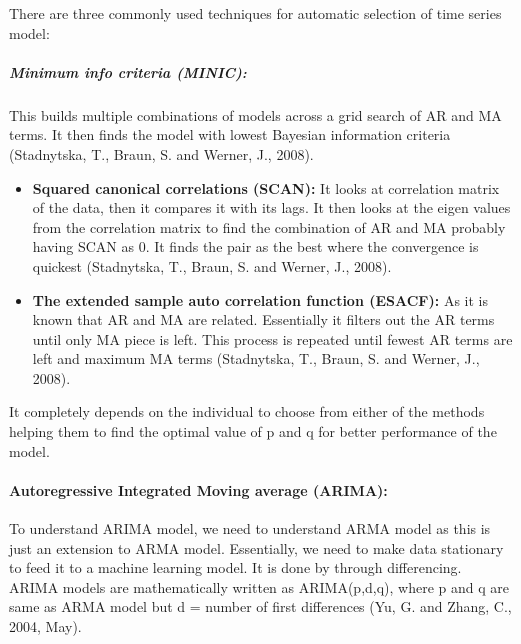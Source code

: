 \documentclass[
  letterpaper,
  DIV=11,
  numbers=noendperiod]{scrartcl}
\let\oldparagraph\paragraph
\renewcommand{\paragraph}[1]{\oldparagraph{#1}\mbox{}}
\let\oldsubparagraph\subparagraph
\renewcommand{\subparagraph}[1]{\oldsubparagraph{#1}\mbox{}}
\begin{document}
There are three commonly used techniques for automatic selection of time
series model:

\hypertarget{minimum-info-criteria-minic}{%
\subparagraph{\texorpdfstring{\textbf{Minimum info criteria
(MINIC):}}{Minimum info criteria (MINIC):}}\label{minimum-info-criteria-minic}}

This builds multiple combinations of models across a grid search of AR
and MA terms. It then finds the model with lowest Bayesian information
criteria (Stadnytska, T., Braun, S. and Werner, J., 2008).

\begin{itemize}
\item
  \textbf{Squared canonical correlations (SCAN):} It looks at
  correlation matrix of the data, then it compares it with its lags. It
  then looks at the eigen values from the correlation matrix to find the
  combination of AR and MA probably having SCAN as 0. It finds the pair
  as the best where the convergence is quickest (Stadnytska, T., Braun,
  S. and Werner, J., 2008).
\item
  \textbf{The extended sample auto correlation function (ESACF):} As it
  is known that AR and MA are related. Essentially it filters out the AR
  terms until only MA piece is left. This process is repeated until
  fewest AR terms are left and maximum MA terms (Stadnytska, T., Braun,
  S. and Werner, J., 2008).
\end{itemize}

It completely depends on the individual to choose from either of the
methods helping them to find the optimal value of p and q for better
performance of the model.

\hypertarget{autoregressive-integrated-moving-average-arima}{%
\paragraph{\texorpdfstring{\textbf{Autoregressive Integrated Moving
average
(ARIMA):}}{Autoregressive Integrated Moving average (ARIMA):}}\label{autoregressive-integrated-moving-average-arima}}

To understand ARIMA model, we need to understand ARMA model as this is
just an extension to ARMA model. Essentially, we need to make data
stationary to feed it to a machine learning model. It is done by through
differencing. ARIMA models are mathematically written as ARIMA(p,d,q),
where p and q are same as ARMA model but d = number of first differences
(Yu, G. and Zhang, C., 2004, May).
\end{document}
